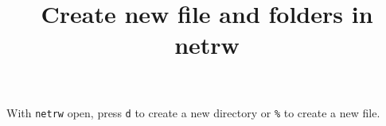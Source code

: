 \documentclass{report}
\title{Create new file and folders in netrw}
\author{}
\date{}
\begin{document}
\maketitle

With \texttt{netrw} open, press \texttt{d} to create a new directory or \texttt{\%} to create a new file.
\end{document}
